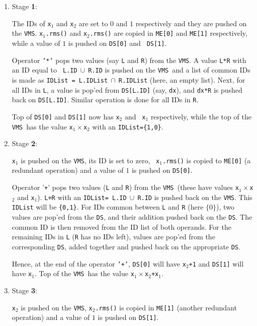 \documentclass[11pt]{article}
\newcommand{\DS}{{\tt DS}}
\newcommand{\VMS}{{\tt VMS}}
\begin{document}
\begin{enumerate}
\item Stage {\bf 1}:
  
  The IDs of {\tt x$_1$} and {\tt x$_2$} are set to $0$ and $1$
  respectively and they are pushed on the \VMS.  {\tt x$_1$.rms()}
  and {\tt x$_2$.rms()} are copied in {\tt ME[0]} and {\tt ME[1]}
  respectively, while a value of $1$ is pushed on {\tt DS[0]} and {\tt
  DS[1]}.
  

  Operator {\tt '*'} pops two values (say {\tt L} and {\tt R}) from
  the \VMS.  A value {\tt L*R} with an ID equal to {\tt
  L.ID}$~\cup~${\tt R.ID} is pushed on the \VMS\ and a list of common
  IDs is made as {\tt IDList = L.IDList}$~\cap~${\tt R.IDList} (here,
  an empty list).  Next, for all IDs in {\tt L}, a value is pop'ed from
  {\tt DS[L.ID]} (say, {\tt dx}), and {\tt dx*R} is pushed back on
  {\tt DS[L.ID]}.  Similar operation is done for all IDs in {\tt R}.
  
  Top of {\tt DS[0]} and {\tt DS[1]} now has {\tt x$_2$} and {\tt
  x$_1$} respectively, while the top of the \VMS\ has the value
  {\tt x$_1 \times $x$_2$} with an {\tt IDList=\{1,0\}}.

\item Stage {\bf 2}:
  
  {\tt x$_1$} is pushed on the \VMS, its ID is set to zero, {\tt
  x$_1$.rms()} is copied to {\tt ME[0]} (a redundant operation) and a
  value of $1$ is pushed on {\tt DS[0]}.
  
  Operator '{\texttt{+}}' pops two values ({\tt L} and {\tt R}) from the
  \VMS\ (these have values {\tt x$_1\times$x$_2$} and {\tt x$_1$}).
  {\tt L+R} with an {\tt IDList= L.ID}$~\cup~${\tt R.ID} is pushed
  back on the \VMS.  This {\tt IDList} will be {\tt \{0,1\}}.  For IDs
  common between {\tt L} and {\tt R} (here $\{0\}$), two values are
  pop'ed from the \DS, and their addition pushed back on the \DS.  The
  common ID is then removed from the ID list of both operands.  For
  the remaining IDs in {\tt L} ({\tt R} has no IDs left), values are
  pop'ed from the corresponding {\tt DS}, added together and pushed
  back on the appropriate {\tt DS}.
  
  Hence, at the end of the operator {\tt '+'}, {\tt DS[0]} will have
  {\tt x$_2$+1} and {\tt DS[1]} will have {\tt x$_1$}.  Top of the
  \VMS\ has the value {\tt x$_1 \times$x$_2$+x$_1$}.

\item Stage {\bf 3}:
  
  {\tt x$_2$} is pushed on the \VMS, {\tt x$_2$.rms()} is copied
  in {\tt ME[1]} (another redundant operation) and a value of $1$ is
  pushed on {\tt DS[1]}.
  

\end{enumerate}
\end{document}
